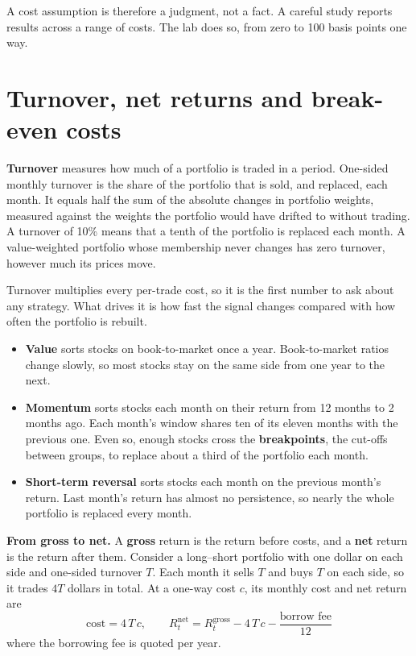 A cost assumption is therefore a judgment, not a fact. A careful study reports results across a range of costs. The lab does so, from zero to 100 basis points one way.

\section{Turnover, net returns and break-even costs}
\label{sec:04-turnover}

\textbf{Turnover} measures how much of a portfolio is traded in a period. One-sided monthly turnover is the share of the portfolio that is sold, and replaced, each month. It equals half the sum of the absolute changes in portfolio weights, measured against the weights the portfolio would have drifted to without trading. A turnover of 10\% means that a tenth of the portfolio is replaced each month. A value-weighted portfolio whose membership never changes has zero turnover, however much its prices move.

Turnover multiplies every per-trade cost, so it is the first number to ask about any strategy. What drives it is how fast the signal changes compared with how often the portfolio is rebuilt.

\begin{itemize}
  \item \textbf{Value} sorts stocks on book-to-market once a year. Book-to-market ratios change slowly, so most stocks stay on the same side from one year to the next.
  \item \textbf{Momentum} sorts stocks each month on their return from 12 months to 2 months ago. Each month's window shares ten of its eleven months with the previous one. Even so, enough stocks cross the \textbf{breakpoints}, the cut-offs between groups, to replace about a third of the portfolio each month.
  \item \textbf{Short-term reversal} sorts stocks each month on the previous month's return. Last month's return has almost no persistence, so nearly the whole portfolio is replaced every month.
\end{itemize}

\textbf{From gross to net.} A \textbf{gross} return is the return before costs, and a \textbf{net} return is the return after them. Consider a long--short portfolio with one dollar on each side and one-sided turnover $T$. Each month it sells $T$ and buys $T$ on each side, so it trades $4T$ dollars in total. At a one-way cost $c$, its monthly cost and net return are
\begin{equation}
  \text{cost} = 4\,T\,c, \qquad R^{\text{net}}_t = R^{\text{gross}}_t - 4\,T\,c - \frac{\text{borrow fee}}{12}
  \label{eq:04-net}
\end{equation}
where the borrowing fee is quoted per year.

